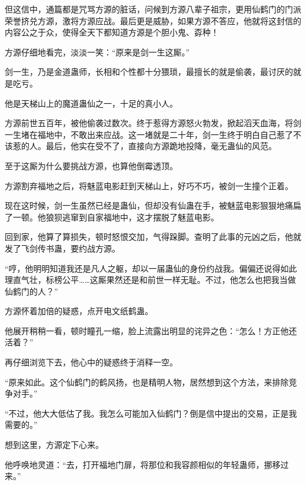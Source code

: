 \begin{this_body}
但这信中，通篇都是咒骂方源的脏话，问候到方源八辈子祖宗，更用仙鹤门的门派荣誉挤兑方源，激将方源应战。最后更是威胁，如果方源不答应，他就将这封信的内容公之于众，使得全天下都知道方源是个胆小鬼、孬种！

方源仔细地看完，淡淡一笑：“原来是剑一生这厮。”

剑一生，乃是金道蛊师，长相和个性都十分猥琐，最擅长的就是偷袭，最讨厌的就是吃亏。

他是天梯山上的魔道蛊仙之一，十足的真小人。

方源前世五百年，被他偷袭过数次。终于惹得方源怒火勃发，掀起滔天血海，将剑一生堵在福地中，不敢出来应战。这一堵就是二十年，剑一生终于明白自己惹了不该惹的人。最后，他实在受不了，直接向方源跪地投降，毫无蛊仙的风范。

至于这厮为什么要挑战方源，也算他倒霉透顶。

方源割弃福地之后，将魅蓝电影赶到天梯山上，好巧不巧，被剑一生撞个正着。

现在这时候，剑一生虽然已经是蛊仙，但却没有仙蛊在手，被魅蓝电影狠狠地痛扁了一顿。他狼狈逃窜到自家福地中，这才摆脱了魅蓝电影。

回到家，他算了算损失，顿时怒恨交加，气得跺脚。查明了此事的元凶之后，他就发了飞剑传书蛊，要约战方源。

“哼，他明明知道我还是凡人之躯，却以一届蛊仙的身份约战我。偏偏还说得如此理直气壮，标榜公平……这厮果然还是和前世一样无耻。不过，他怎么也把我当做仙鹤门的人？”

方源怀着加倍的疑惑，点开电文纸鹤蛊。

他展开稍稍一看，顿时瞳孔一缩，脸上流露出明显的诧异之色：“怎么！方正他还活着？”

再仔细浏览下去，他心中的疑惑终于消释一空。

“原来如此。这个仙鹤门的鹤风扬，也是精明人物，居然想到这个方法，来排除竞争对手。”

“不过，他大大低估了我。我怎么可能加入仙鹤门？倒是信中提出的交易，正是我需要的。”

想到这里，方源定下心来。

他呼唤地灵道：“去，打开福地门扉，将那位和我容颜相似的年轻蛊师，挪移过来。”

\end{this_body}

